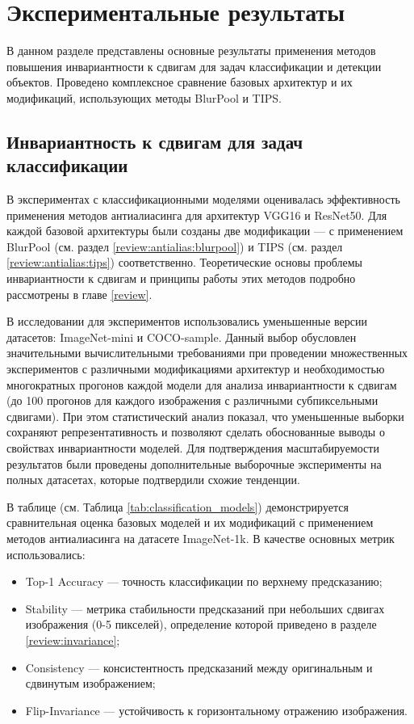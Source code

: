 \section{Экспериментальные результаты}
\label{sec:results} 

В данном разделе представлены основные результаты применения методов повышения инвариантности к сдвигам для задач классификации и детекции объектов. Проведено комплексное сравнение базовых архитектур и их модификаций, использующих методы BlurPool и TIPS.

\subsection{Инвариантность к сдвигам для задач классификации}
\label{ssec:classification_results}

В экспериментах с классификационными моделями оценивалась эффективность применения методов антиалиасинга для архитектур VGG16 и ResNet50. Для каждой базовой архитектуры были созданы две модификации — с применением BlurPool (см. раздел \ref{review:antialias:blurpool}) и TIPS (см. раздел \ref{review:antialias:tips}) соответственно. Теоретические основы проблемы инвариантности к сдвигам и принципы работы этих методов подробно рассмотрены в главе \ref{review}.

\begin{note}
В исследовании для экспериментов использовались уменьшенные версии датасетов: ImageNet-mini и COCO-sample. Данный выбор обусловлен значительными вычислительными требованиями при проведении множественных экспериментов с различными модификациями архитектур и необходимостью многократных прогонов каждой модели для анализа инвариантности к сдвигам (до 100 прогонов для каждого изображения с различными субпиксельными сдвигами). При этом статистический анализ показал, что уменьшенные выборки сохраняют репрезентативность и позволяют сделать обоснованные выводы о свойствах инвариантности моделей. Для подтверждения масштабируемости результатов были проведены дополнительные выборочные эксперименты на полных датасетах, которые подтвердили схожие тенденции.
\end{note}

В таблице (см. Таблица \ref{tab:classification_models}) демонстрируется сравнительная оценка базовых моделей и их модификаций с применением методов антиалиасинга на датасете ImageNet-1k. В качестве основных метрик использовались:

\begin{itemize}
    \item Top-1 Accuracy — точность классификации по верхнему предсказанию;
    \item Stability — метрика стабильности предсказаний при небольших сдвигах изображения (0-5 пикселей), определение которой приведено в разделе \ref{review:invariance};
    \item Consistency — консистентность предсказаний между оригинальным и сдвинутым изображением;
    \item Flip-Invariance — устойчивость к горизонтальному отражению изображения.
\end{itemize}


